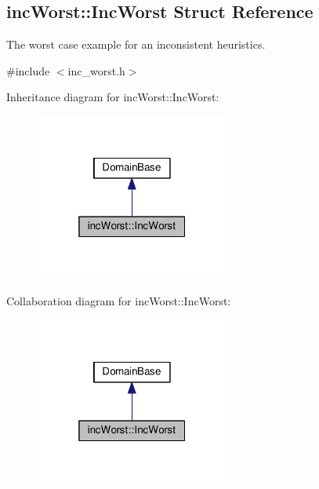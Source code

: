 \hypertarget{structincWorst_1_1IncWorst}{}\subsection{inc\+Worst\+:\+:Inc\+Worst Struct Reference}
\label{structincWorst_1_1IncWorst}


The worst case example for an inconsistent heuristics.  




{\ttfamily \#include $<$inc\+\_\+worst.\+h$>$}



Inheritance diagram for inc\+Worst\+:\+:Inc\+Worst\+:\nopagebreak
\begin{figure}[H]
\begin{center}
\leavevmode
\includegraphics[width=181pt]{structincWorst_1_1IncWorst__inherit__graph}
\end{center}
\end{figure}


Collaboration diagram for inc\+Worst\+:\+:Inc\+Worst\+:\nopagebreak
\begin{figure}[H]
\begin{center}
\leavevmode
\includegraphics[width=181pt]{structincWorst_1_1IncWorst__coll__graph}
\end{center}
\end{figure}
